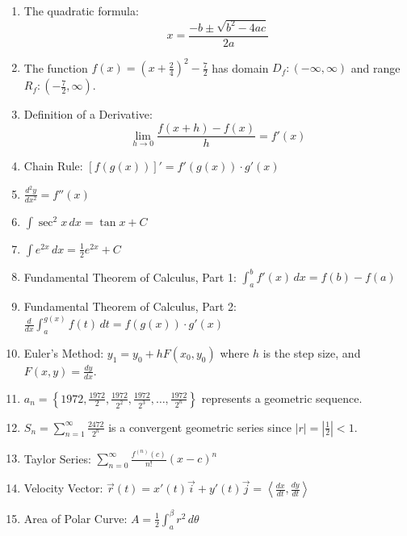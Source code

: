 \documentclass{article}
\begin{document}
\begin{enumerate}[label=(\alph*)]
\item The quadratic formula:
    \[x = \frac{-b \pm \sqrt{b^2 - 4ac}}{2a}\]

\item The function $f(x) = \left(x + \frac{2}{4}\right)^2 - \frac{7}{2}$ has domain $D_f: (-\infty, \infty)$ and range $R_f: \left(-\frac{7}{2}, \infty\right)$.

\item Definition of a Derivative:
    \[\lim_{h \to 0} \frac{f(x+h) - f(x)}{h} = f'(x)\]

\item Chain Rule: $[f(g(x))]' = f'(g(x)) \cdot g'(x)$

\item $\frac{d^2y}{dx^2} = f''(x)$

\item $\int \sec^2 x \, dx = \tan x + C$

\item $\int e^{2x} \, dx = \frac{1}{2} e^{2x} + C$

\item Fundamental Theorem of Calculus, Part 1: $\int_a^b f'(x) \, dx = f(b) - f(a)$

\item Fundamental Theorem of Calculus, Part 2: $\frac{d}{dx} \int_a^{g(x)} f(t) \, dt = f(g(x)) \cdot g'(x)$

\item Euler's Method: $y_1 = y_0 + hF(x_0, y_0)$ where $h$ is the step size, and $F(x, y) = \frac{dy}{dx}$.

\item $a_n = \left\{1972, \frac{1972}{2}, \frac{1972}{2^2}, \frac{1972}{2^3}, \dots, \frac{1972}{2^n}\right\}$ represents a geometric sequence.

\item $S_n = \sum_{n=1}^\infty \frac{2472}{2^n}$ is a convergent geometric series since $|r| = \left|\frac{1}{2}\right| < 1$.

\item Taylor Series: $\sum_{n=0}^\infty \frac{f^{(n)}(c)}{n!} (x-c)^n$

\item Velocity Vector: $\vec{r}(t) = x'(t)\vec{i} + y'(t)\vec{j} = \left\langle \frac{dx}{dt}, \frac{dy}{dt} \right\rangle$

\item Area of Polar Curve: $A = \frac{1}{2} \int_a^\beta r^2 \, d\theta$

\end{enumerate}
\end{document}
